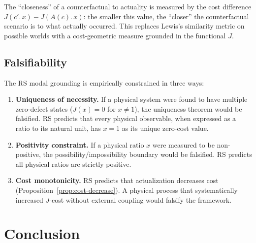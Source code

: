 \documentclass[12pt,a4paper]{article}
\theoremstyle{definition}
\theoremstyle{remark}
\begin{document}
The ``closeness'' of a counterfactual to actuality is measured by the
cost difference $J(c'.\,x) - J(A(c).\,x)$: the smaller this value, the
``closer'' the counterfactual scenario is to what actually occurred.
This replaces Lewis's similarity metric on possible worlds with a
cost-geometric measure grounded in the functional $J$.

\subsection{Falsifiability}

The RS modal grounding is empirically constrained in three ways:
\begin{enumerate}
  \item \textbf{Uniqueness of necessity.}  If a physical system were
  found to have multiple zero-defect states ($J(x) = 0$ for
  $x \neq 1$), the uniqueness theorem would be falsified.  RS predicts
  that every physical observable, when expressed as a ratio to its
  natural unit, has $x = 1$ as its unique zero-cost value.
  \item \textbf{Positivity constraint.}  If a physical ratio $x$ were
  measured to be non-positive, the possibility/impossibility boundary
  would be falsified.  RS predicts all physical ratios are strictly
  positive.
  \item \textbf{Cost monotonicity.}  RS predicts that actualization
  decreases cost (Proposition~\ref{prop:cost-decrease}).  A physical
  process that systematically increased $J$-cost without external
  coupling would falsify the framework.
\end{enumerate}

\section{Conclusion}
\label{sec:conclusion}
\end{document}
